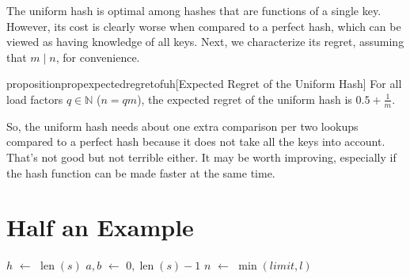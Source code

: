 \documentclass[sigconf]{acmart}
\newcommand*\Let[2]{\State #1 $\gets$ #2}
\newcommand*{\natnum}{\mathbb{N}}
\renewcommand{\label}[1]{%
    \gdef\sfname{sf:##1}}%
\begin{document}
The uniform hash is optimal among hashes that are functions of a single key.
However, its cost is clearly worse when compared to a perfect hash, which can be viewed as having knowledge of all keys.
Next, we characterize its regret, assuming that $m \mid n$, for convenience.

\begin{restatable}{proposition}{propexpectedregretofuh}[Expected Regret of the Uniform Hash]
\label{prop:regret-of-uh}
For all load factors $q \in \natnum$ ($n=qm$), the expected regret of the uniform hash is $0.5 + \frac{1}{m}$.
\end{restatable}

So, the uniform hash needs about one extra comparison per two lookups compared to a perfect hash because it does not take all the keys into account.
That's not good but not terrible either.
It may be worth improving, especially if the hash function can be made faster at the same time.


\section{Half an Example}
\label{sec:half-an-example}

\begin{algorithm}[t]
  \caption{\small Hashing strings with a $\mathit{limit}$ on the number of characters taken into account. The algorithm moves inwards from the two ends of the string because those tend to be the most informative and because this scheme can be easily extended to reuse a previously computed hash with a lower limit. The function $\mathit{add\_char}$ performs one step of the FNV-1A algorithm.}
  \label{alg:string-hash}
  \begin{algorithmic}[1]
      \Let{$h$}{$\operatorname{len}(s)$}
      \Let{$a, b$}{$0, \operatorname{len}(s)-1$}
      \Let{$n$}{$\min(\mathit{limit}, l)$}
      \EndWhile
      \EndIf
      \State{}
    \EndFunction
  \end{algorithmic}
\end{algorithm}
\end{document}
